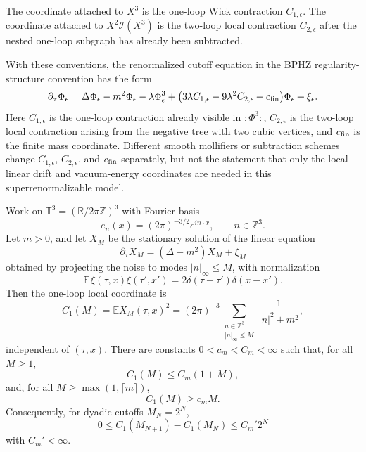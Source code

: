 The coordinate attached to \(X^3\) is the one-loop Wick contraction
\(C_{1,\epsilon}\).  The coordinate attached to \(X^2\mathcal I(X^3)\) is
the two-loop local contraction \(C_{2,\epsilon}\) after the nested
one-loop subgraph has already been subtracted.

With these conventions, the renormalized cutoff equation in the BPHZ
regularity-structure convention
has the form
\begin{equation}
  \partial_\tau\Phi_\epsilon
  =
  \Delta\Phi_\epsilon-m^2\Phi_\epsilon
  -\lambda\Phi_\epsilon^3
  +
  \bigl(3\lambda C_{1,\epsilon}
        -9\lambda^2 C_{2,\epsilon}
        +c_{\rm fin}\bigr)\Phi_\epsilon
  +\xi_\epsilon .
  \label{eq:phi-four-three-renormalized-spde}
\end{equation}
Here \(C_{1,\epsilon}\) is the one-loop contraction already visible in
\(:\!\Phi^3\!:\), \(C_{2,\epsilon}\) is the two-loop local contraction
arising from the negative tree with two cubic vertices, and \(c_{\rm fin}\)
is the finite mass coordinate.  Different smooth mollifiers or subtraction
schemes change \(C_{1,\epsilon}\), \(C_{2,\epsilon}\), and \(c_{\rm fin}\)
separately, but not the statement that only the local linear drift and
vacuum-energy coordinates are needed in this superrenormalizable model.

\begin{example}
\label{ex:spde-phi-four-three-c1-fourier-growth}
Work on \(\mathbb T^3=(\mathbb R/2\pi\mathbb Z)^3\) with Fourier basis
\[
  e_n(x)=(2\pi)^{-3/2}e^{in\cdot x},\qquad n\in\mathbb Z^3 .
\]
Let \(m>0\), and let \(X_M\) be the stationary solution of the linear
equation
\[
  \partial_\tau X_M=(\Delta-m^2)X_M+\xi_M
\]
obtained by projecting the noise to modes \(|n|_\infty\leq M\), with
normalization
\[
  \mathbb E\,\xi(\tau,x)\xi(\tau',x')
  =
  2\delta(\tau-\tau')\delta(x-x').
\]
Then the one-loop local coordinate is
\begin{equation}
  C_1(M)
  =
  \mathbb E X_M(\tau,x)^2
  =
  (2\pi)^{-3}
  \sum_{\substack{n\in\mathbb Z^3\\ |n|_\infty\leq M}}
  \frac{1}{|n|^2+m^2},
  \label{eq:spde-c1-sharp-fourier-cutoff}
\end{equation}
independent of \((\tau,x)\).  There are constants \(0<c_m<C_m<\infty\)
such that, for all \(M\geq1\),
\[
  C_1(M)\leq C_m(1+M),
\]
and, for all \(M\geq \max(1,\lceil m\rceil)\),
\[
  C_1(M)\geq c_m M .
\]
Consequently, for dyadic cutoffs \(M_N=2^N\),
\[
  0\leq C_1(M_{N+1})-C_1(M_N)\leq C_m'2^N
\]
with \(C_m'<\infty\).
\end{example}

